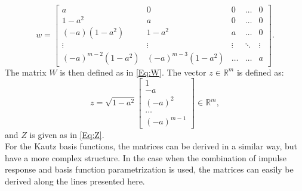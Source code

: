 \documentclass[10 pt, letterpaper]{article}
\newcommand{\ba}{\begin{array}}
\newcommand{\ea}{\end{array}}
\newcommand{\bR}{{\mathbb R}}
\begin{document}
\begin{equation*}
w=\left[\ba{ccccc} a & 0 & 0 & \hdots & 0\\
                                                    1-a^2 & a & 0 &\hdots & 0\\
                                                     (-a)(1-a^2) & 1-a^2 & a & \hdots & 0\\
                                                     \vdots & \vdots & \vdots & \ddots & \vdots\\
                                                     (-a)^{m-2}(1-a^2) & (-a)^{m-3}(1-a^2)& \hdots &\hdots& a \ea   \right].
\end{equation*}
The matrix $W$ is then defined as in \eqref{Eq:W}. The vector $z\in \bR^m$ is defined as:
\begin{equation*}
z=\sqrt{1-a^2}\left[\ba{c} 1\\-a\\(-a)^2\\ \hdots \\ (-a)^{m-1} \ea  \right]\in \bR^m,
\end{equation*}
and $Z$ is given as in \eqref{Eq:Z}.\\
For the Kautz basis functions, the matrices can be derived in a similar way, but have a more complex structure. In the case when the combination of impulse response and basis function parametrization is used, the matrices can easily be derived along the lines presented here.
\end{document}
